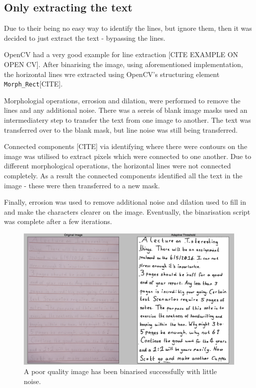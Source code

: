 \subsection{Only extracting the text}
Due to their being no easy way to identify the lines, but ignore them, then it was decided to just extract the text - bypassing the lines.

OpenCV had a very good example for line extraction [CITE EXAMPLE ON OPEN CV]. After binarising the image, using aforementioned implementation, the horizontal lines wre extracted using OpenCV's structuring element \texttt{Morph\_Rect}[CITE].

Morphologial operations, errosion and dilation, were performed to remove the lines and any additional noise. There was a sereis of blank image masks used an intermediatery step to transfer the text from one image to another. The text was transferred over to the blank mask, but line noise was still being transferred.

Connected components [CITE] via identifying where there were contours on the image was utilised to extract pixels which were connected to one another. Due to different morphological operations, the horizontal lines were not connected completely. As a result the connected components identified all the text in the image - these were then transferred to a new mask.

Finally, errosion was used to remove additional noise and dilation used to fill in and make the characters clearer on the image. Eventually, the binarisation script was complete after a few iterations.

\begin{figure}[H]
  \centering
  \includegraphics{images/hard_image}
  \caption{A poor quality image has been binarised successfully with little noise.}
  \label{fig:poor_quality}
\end{figure}

